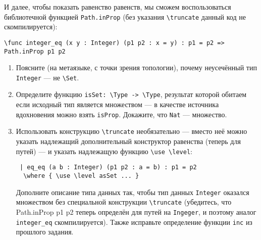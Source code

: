 \documentclass[10pt,a4paper,oneside]{article}
\begin{document}
\begin{enumerate}
И далее, чтобы показать равенство равенств, мы сможем воспользоваться библиотечной функцией \verb!Path.inProp!
(без указания \verb!\truncate! данный код не скомпилируется):

\begin{verbatim}
\func integer_eq (x y : Integer) (p1 p2 : x = y) : p1 = p2 => Path.inProp p1 p2
\end{verbatim}

\begin{enumerate}
\item Поясните (на метаязыке, с точки зрения топологии), почему неусечённый тип \verb!Integer! --- не \verb!\Set!. 
\item Определите функцию \verb!isSet: \Type -> \Type!, результат которой обитаем если исходный тип является множеством ---
в качестве источника вдохновения можно взять \verb!isProp!.
Докажите, что \verb!Nat! --- множество.
\item Использовать конструкцию \verb!\truncate! необязательно --- вместо неё можно указать надлежащий дополнительный конструктор
равенства (теперь для путей) --- и указать надлежащую функцию \verb!\use \level!:
\begin{verbatim}
 | eq_eq (a b : Integer) (p1 p2 : a = b) : p1 = p2
  \where { \use \level asSet ... }
\end{verbatim}

Дополните описание типа данных так, чтобы тип данных \verb!Integer! оказался множеством без специальной конструкции 
\verb!\truncate! (убедитесь, что Path.inProp p1 p2 теперь определён для путей на \verb!Ingeger!, 
и поэтому аналог \verb!integer_eq! скомпилируется).
Также исправьте определение функции \verb!inc! из прошлого задания.

\end{enumerate}

%


\end{enumerate}
\end{document}
